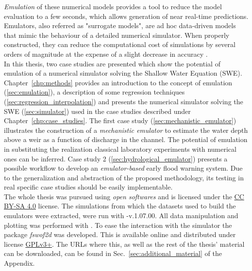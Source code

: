 \emph{Emulation} of these numerical models provides a tool to reduce the model evaluation to a few seconds, which allows generation of near real-time predictions.
Emulators, also referred as "surrogate models", are ad hoc data-driven models that mimic the behaviour of a detailed numerical simulator. When properly constructed, they can reduce the computational cost of simulations by several orders of magnitude at the expense of a slight decrease in accuracy \autocite{carbajal_appraisal_2016}.\\

In this thesis, two case studies are presented which show the potential of emulation of a numerical simulator solving the Shallow Water Equation (SWE). 
Chapter~\ref{chp:methods} provides an introduction to the concept of emulation (\ref{sec:emulation}), a description of some regression techniques (\ref{sec:regression_interpolation}) and presents the numerical simulator solving the SWE (\ref{sec:simulator}) used in the case studies described under Chapter~\ref{chp:case_studies}.
The first case study (\ref{sec:mechanistic_emulator}) illustrates the construction of a \emph{mechanistic emulator} to estimate the water depth above a weir as a function of discharge in the channel.
The potential of emulation in substituting the realization classical laboratory experiments with numerical ones can be inferred.
Case study 2 (\ref{sec:hydrological_emulator}) presents a possible workflow to develop an \emph{emulator-based} early flood warning system. 
Due to the generalization and abstraction of the proposed methodology, its testing in real specific case studies should be easily implementable.\\


The whole thesis was pursued using \emph{open softwares} and is licensed under the \href{https://creativecommons.org/licenses/by-sa/4.0/}{CC BY-SA 4.0} license.
The simulations from which the datasets used to build the emulators were extracted, were run with -v.1.07.00.
All data manipulation and plotting was performed with .
To ease the interaction with the simulator the  package \emph{fswof2d} was developed.
This is available online and distributed under license \href{https://www.gnu.org/licenses/quick-guide-gplv3.html}{GPLv3+}.
The URLs where this, as well as the rest of the thesis' material can be downloaded, can be found in Sec.~\ref{sec:additional_material} of the Appendix.

